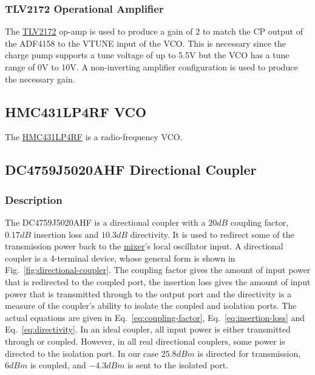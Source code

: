 \subsubsection{TLV2172 Operational Amplifier}
\label{sec:tlv2172-op-amp}

The \href{http://www.ti.com/lit/ds/symlink/tlv172.pdf}{TLV2172} op-amp is used to produce a gain of
2 to match the CP output of the ADF4158 to the VTUNE input of the VCO. This is necessary since the
charge pump supports a tune voltage of up to 5.5V but the VCO has a tune range of 0V to 10V. A
non-inverting amplifier configuration is used to produce the necessary gain.

\subsection{HMC431LP4RF VCO}
\label{sec:hmc431lp4rf}

The
\href{http://www.analog.com/media/en/technical_documentation/data_sheets/hmc431.pdf}{HMC431LP4RF} is
a radio-frequency VCO\@.

\subsection{DC4759J5020AHF Directional Coupler}
\label{sec:dc4759j5020ahf}

\subsubsection{Description}
\label{sec:dc4759j5020ahf-description}

The DC4759J5020AHF is a directional coupler with a $20 \si{dB}$ coupling factor, $0.17 \si{dB}$
insertion loss and $10.3 \si{dB}$ directivity. It is used to redirect some of the transmission power
back to the \hyperref[sec:adl5802]{mixer}'s local oscillator input. A directional coupler is a
4-terminal device, whose general form is shown in Fig.~\ref{fig:directional-coupler}. The coupling
factor gives the amount of input power that is redirected to the coupled port, the insertion loss
gives the amount of input power that is transmitted through to the output port and the directivity
is a measure of the coupler's ability to isolate the coupled and isolation ports. The actual
equations are given in Eq.~\ref{eq:coupling-factor}, Eq.~\ref{eq:insertion-loss} and
Eq.~\ref{eq:directivity}. In an ideal coupler, all input power is either transmitted through or
coupled. However, in all real directional couplers, some power is directed to the isolation port. In
our case $25.8 \si{dBm}$ is directed for transmission, $6 \si{dBm}$ is coupled, and $-4.3 \si{dBm}$
is sent to the isolated port.

